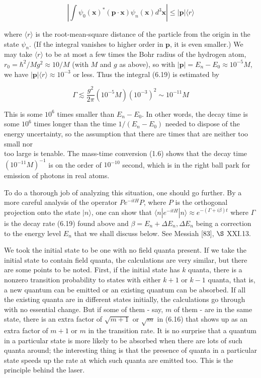 \documentclass[10pt, letterpaper]{article}
\begin{document}
$$
\left|\int \psi_{0}(\mathbf{x})^{*}(\mathbf{p} \cdot \mathbf{x}) \psi_{n}(\mathbf{x}) d^{3} \mathbf{x}\right| \leq|\mathbf{p}|\langle r\rangle
$$

where $\langle r\rangle$ is the root-mean-square distance of the particle from the origin in the state $\psi_{n}$. (If the integral vanishes to higher order in $\mathbf{p}$, it is even smaller.) We may take $\langle r\rangle$ to be at most a few times the Bohr radius of the hydrogen atom, $r_{0}=\hbar^{2} / M g^{2} \approx 10 / M$ (with $M$ and $g$ as above), so with $|\mathbf{p}|=E_{n}-E_{0} \approx 10^{-5} M$, we have $|\mathbf{p}|\langle r\rangle \approx 10^{-3}$ or less. Thus the integral (6.19) is estimated by

$$
\Gamma \lesssim \frac{g^{2}}{2 \pi}\left(10^{-5} M\right)\left(10^{-3}\right)^{2} \sim 10^{-11} M
$$

This is some $10^{6}$ times smaller than $E_{n}-E_{0}$. In other words, the decay time is some $10^{6}$ times longer than the time $1 /\left(E_{n}-E_{0}\right)$ needed to dispose of the energy uncertainty, so the assumption that there are times that are neither too small nor\\
too large is tenable. The mass-time conversion (1.6) shows that the decay time $\left(10^{-11} M\right)^{-1}$ is on the order of $10^{-10}$ second, which is in the right ball park for emission of photons in real atoms.

To do a thorough job of analyzing this situation, one should go further. By a more careful analysis of the operator $P e^{-i t H} P$, where $P$ is the orthogonal projection onto the state $|n\rangle$, one can show that $\langle n| e^{-i t H}|n\rangle \approx e^{-(\Gamma+i \beta) t}$ where $\Gamma$ is the decay rate (6.19) found above and $\beta=E_{n}+\Delta E_{n}, \Delta E_{n}$ being a correction to the energy level $E_{n}$ that we shall discuss below. See Messiah [83], $\S$ XXI.13.

We took the initial state to be one with no field quanta present. If we take the initial state to contain field quanta, the calculations are very similar, but there are some points to be noted. First, if the initial state has $k$ quanta, there is a nonzero transition probability to states with either $k+1$ or $k-1$ quanta, that is, a new quantum can be emitted or an existing quantum can be absorbed. If all the existing quanta are in different states initially, the calculations go through with no essential change. But if some of them - say, $m$ of them - are in the same state, there is an extra factor of $\sqrt{m+1}$ or $\sqrt{m}$ in (6.16) that shows up as an extra factor of $m+1$ or $m$ in the transition rate. It is no surprise that a quantum in a particular state is more likely to be absorbed when there are lots of such quanta around; the interesting thing is that the presence of quanta in a particular state speeds up the rate at which such quanta are emitted too. This is the principle behind the laser.
\end{document}
